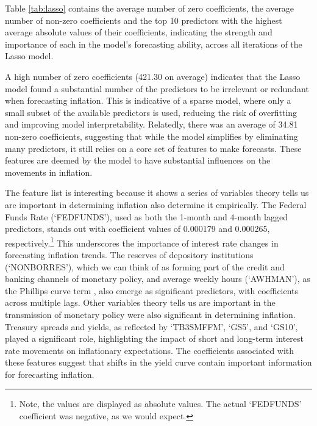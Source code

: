 Table \ref{tab:lasso} contains the average number of zero coefficients, the average number of non-zero coefficients and the top 10 predictors with the highest average absolute values of their coefficients, indicating the strength and importance of each in the model's forecasting ability, across all iterations of the Lasso model.

A high number of zero coefficients (421.30 on average) indicates that the Lasso model found a substantial number of the predictors to be irrelevant or redundant when forecasting inflation. This is indicative of a sparse model, where only a small subset of the available predictors is used, reducing the risk of overfitting and improving model interpretability. Relatedly, there was an average of 34.81 non-zero coefficients, suggesting that while the model simplifies by eliminating many predictors, it still relies on a core set of features to make forecasts. These features are deemed by the model to have substantial influences on the movements in inflation.

The feature list is interesting because it shows a series of variables theory tells us are important in determining inflation also determine it empirically. The Federal Funds Rate (`FEDFUNDS'), used as both the 1-month and 4-month lagged predictors, stands out with coefficient values of 0.000179 and 0.000265, respectively.\footnote{Note, the values are displayed as absolute values. The actual `FEDFUNDS' coefficient was negative, as we would expect.} This underscores the importance of interest rate changes in forecasting inflation trends. The reserves of depository institutions (`NONBORRES'), which we can think of as forming part of the credit and banking channels of monetary policy, and average weekly hours (`AWHMAN'), as the Phillips curve term \autocite{Phillips1958The186119571}, also emerge as significant predictors, with coefficients across multiple lags. Other variables theory tells us are important in the transmission of monetary policy were also significant in determining inflation. Treasury spreads and yields, as reflected by `TB3SMFFM', `GS5', and `GS10', played a significant role, highlighting the impact of short and long-term interest rate movements on inflationary expectations. The coefficients associated with these features suggest that shifts in the yield curve contain important information for forecasting inflation.


